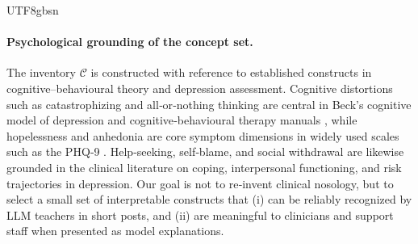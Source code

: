 \documentclass[lettersize,journal]{IEEEtran}
\begin{document}
\begin{CJK*}{UTF8}{gbsn}
\paragraph{Psychological grounding of the concept set.}
The inventory $\mathcal{C}$ is constructed with reference to established constructs in cognitive–behavioural theory and depression assessment. Cognitive distortions such as catastrophizing and all‑or‑nothing thinking are central in Beck's cognitive model of depression and cognitive‑behavioural therapy manuals \cite{beck1991cognitive,beck1972measuring}, while hopelessness and anhedonia are core symptom dimensions in widely used scales such as the PHQ‑9 \cite{kroenke2001phq}. Help‑seeking, self‑blame, and social withdrawal are likewise grounded in the clinical literature on coping, interpersonal functioning, and risk trajectories in depression. Our goal is not to re‑invent clinical nosology, but to select a small set of interpretable constructs that (i) can be reliably recognized by LLM teachers in short posts, and (ii) are meaningful to clinicians and support staff when presented as model explanations.


\end{CJK*}
\end{document}
